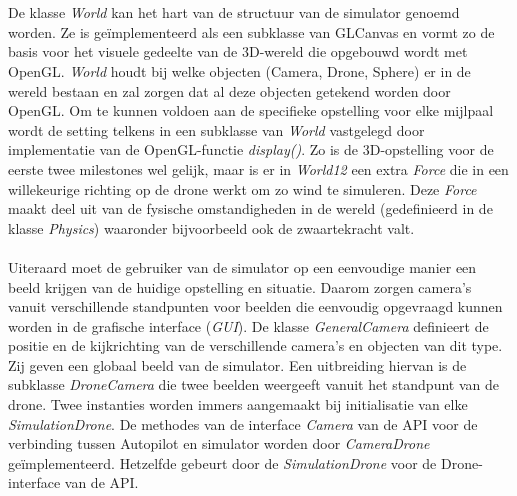 \\
\\
De klasse \textit{World} kan het hart van de structuur van de simulator genoemd worden. 
Ze is ge\"implementeerd als een subklasse van GLCanvas en vormt zo de basis voor het visuele gedeelte van de 3D-wereld die opgebouwd wordt met OpenGL. \textit{World} houdt bij welke objecten (Camera, Drone, Sphere) er in de wereld bestaan en zal zorgen dat al deze objecten getekend worden door OpenGL. Om te kunnen voldoen aan de specifieke opstelling voor elke mijlpaal wordt de setting telkens in een subklasse van \textit{World} vastgelegd door implementatie van de OpenGL-functie \textit{display()}. Zo is de 3D-opstelling voor de eerste twee milestones wel gelijk, maar is er in \textit{World12} een extra \textit{Force} die in een willekeurige richting op de drone werkt om zo wind te simuleren. Deze \textit{Force} maakt deel uit van de fysische omstandigheden in de wereld (gedefinieerd in de klasse \textit{Physics}) waaronder bijvoorbeeld ook de zwaartekracht valt. 
\\
\\
Uiteraard moet de gebruiker van de simulator op een eenvoudige manier een beeld krijgen van de huidige opstelling en situatie. Daarom zorgen camera's vanuit verschillende standpunten voor beelden die eenvoudig opgevraagd kunnen worden in de grafische interface (\textit{GUI}). De klasse \textit{GeneralCamera} definieert de positie en de kijkrichting van de verschillende camera's en objecten van dit type. Zij geven een globaal beeld van de simulator. Een uitbreiding hiervan is de subklasse \textit{DroneCamera} die twee beelden weergeeft vanuit het standpunt van de drone. Twee instanties worden immers aangemaakt bij initialisatie van elke \textit{SimulationDrone}. De methodes van de interface \textit{Camera} van de API voor de verbinding tussen Autopilot en simulator worden door \textit{CameraDrone} ge\"implementeerd. Hetzelfde gebeurt door de \textit{SimulationDrone} voor de Drone-interface van de API.